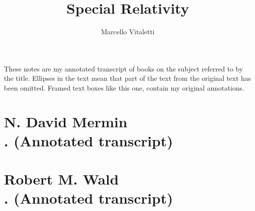 \documentclass[english, 11pt]{book}
\begin{document}
\author{Marcello Vitaletti}
\title{Special Relativity\\
{\small }}
\maketitle
\begin{mdframed}[leftmargin=-10pt,rightmargin=-10pt]
These notes are my annotated transcript of books on the subject referred to by the title. Ellipses in the text mean that part of the text from the original text has been omitted. Framed text boxes like this one, contain my original annotations.
\end{mdframed}


\frontmatter%

%

%	
\tableofcontents

\mainmatter%

\part{N. David Mermin\\ {\small {}. (Annotated transcript)}}


\part{Robert M. Wald\\ {\small {}. (Annotated transcript)}}

%



\backmatter%
%
\printindex

\end{document}
